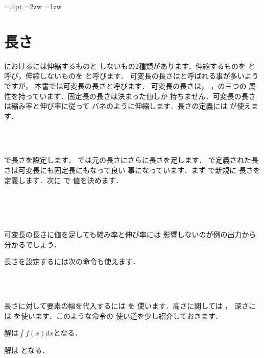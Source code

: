 %
%
%
\begin{InTeX}
\columnseprule=.4pt %
\columnsep=2zw %
\multicolsep=1zw %
\end{InTeX}


\section{長さ} 
{\laTEX}におけるには伸縮するものと
しないもの2種類があります．伸縮するものを
{}と呼び，伸縮しないものを
{}と呼びます．
可変長の長さは{}と呼ばれる事が多いようですが，
本書では可変長の長さと呼びます．
可変長の長さは{}，
{}，{}の三つの
属性を持っています．固定長の長さは決まった値しか
持ちません．可変長の長さは縮み率と伸び率に従って
バネのように伸縮します．長さの定義には が使えます．
\begin{Syntax}
\\
 \\
\end{Syntax}
で長さを設定します．
では元の長さにさらに長さを足します．
で定義された長さは可変長にも固定長にもなって良い
事になっています．まず で新規に
長さを定義します．次に で
値を決めます．
\begin{InOut}
\newlength{\newa}\the\newa\\
\setlength{\newa}{10mm}\the\newa\\
\setlength{\newa}{10mm plus 3mm
   minus 2mm}\the\newa\\
\addtolength{\newa}{3mm}\the\newa
\end{InOut}
可変長の長さに値を足しても縮み率と伸び率には
影響しないのが例の出力から分かるでしょう．

長さを設定するには次の命令も使えます．
\begin{Syntax}
 \\
 \\
\end{Syntax}
長さに対して要素の幅を代入するには を
使います．高さに関しては ，
深さには を使います．このような命令の
使い道を少し紹介しておきます．
\begin{InOut}
\newcommand{\fakewidth}[1]{%
  \settowidth{\newa}{#1}%
  \framebox[\the\newa][c]{\strut}}
解は{$\int f(x)dx$}となる．\par
解は\fakewidth{$\int f(x)dx$}となる．
\end{InOut}



